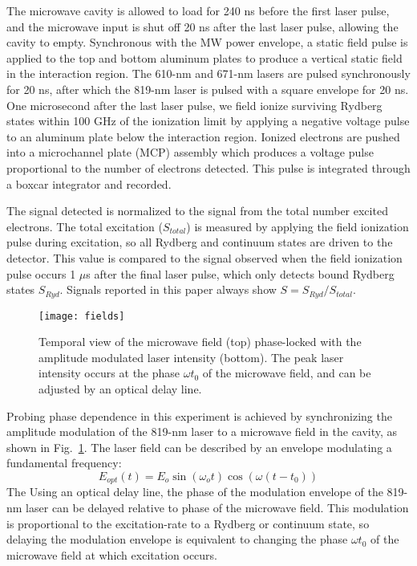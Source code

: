 \documentclass[aps,pra,preprint,groupedaddress]{revtex4-1}
\begin{document}

The microwave cavity is allowed to load for 240 ns before the first laser pulse, and the microwave input is shut off 20 ns after the last laser pulse, allowing the cavity to empty. Synchronous with the MW power envelope, a static field pulse is applied to the top and bottom aluminum plates to produce a vertical static field in the interaction region. The 610-nm and 671-nm lasers are pulsed synchronously for 20 ns, after which the 819-nm laser is pulsed with a square envelope for 20 ns. One microsecond after the last laser pulse, we field ionize surviving Rydberg states within 100 GHz of the ionization limit by applying a negative voltage pulse to an aluminum plate below the interaction region. Ionized electrons are pushed into a microchannel plate (MCP) assembly which produces a voltage pulse proportional to the number of electrons detected. This pulse is integrated through a boxcar integrator and recorded.

The signal detected is normalized to the signal from the total number excited electrons. The total excitation ($S_{total}$) is measured by applying the field ionization pulse during excitation, so all Rydberg and continuum states are driven to the detector. This value is compared to the signal observed when the field ionization pulse occurs 1 $\mu$s after the final laser pulse, which only detects bound Rydberg states $S_{Ryd}$. Signals reported in this paper always show $S = S_{Ryd} / S_{total}$.

\begin{figure}
	\texttt{[image: fields]}
	\caption{Temporal view of the microwave field (top) phase-locked with the amplitude modulated laser intensity (bottom). The peak laser intensity occurs at the phase $\omega t_0$ of the microwave field, and can be adjusted by an optical delay line.}
	\label{fig:AMLaser}
\end{figure}

Probing phase dependence in this experiment is achieved by synchronizing the amplitude modulation of the 819-nm laser to a microwave field in the cavity, as shown in Fig.~\ref{fig:AMLaser}. The laser field can be described by an envelope modulating a fundamental frequency:
\begin{equation}
E_{opt}(t) = E_o \sin{(\omega_o t)} \cos{(\omega(t-t_0))}
\end{equation}
The 
Using an optical delay line, the phase of the modulation envelope of the 819-nm laser can be delayed relative to phase of the microwave field. This modulation is proportional to the excitation-rate to a Rydberg or continuum state, so delaying the modulation envelope is equivalent to changing the phase $\omega t_0$ of the microwave field at which excitation occurs.
\end{document}
